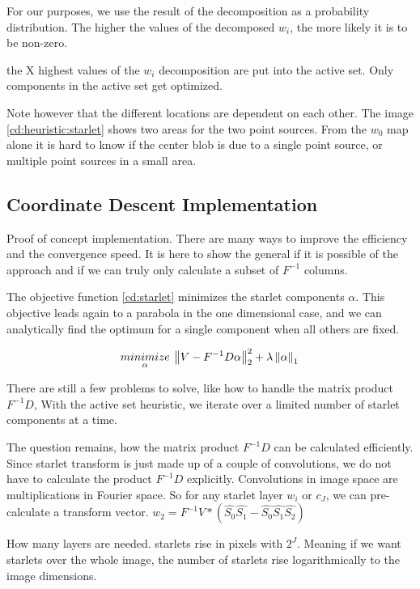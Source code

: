 For our purposes, we use the result of the decomposition as a probability distribution. The higher the values of the decomposed $w_i$, the more likely it is to be non-zero.

the X highest values of the $w_i$ decomposition are put into the active set. Only components in the active set get optimized.

Note however that the different locations are dependent on each other. The image \ref{cd:heuristic:starlet} shows two areas for the two point sources. From the $w_0$ map alone it is hard to know if the center blob is due to a single point source, or multiple point sources in a small area.


\subsection{Coordinate Descent Implementation}
Proof of concept implementation. There are many ways to improve the efficiency and the convergence speed. It is here to show  the general if it is possible of the approach and if we can truly only calculate a subset of $F^{-1}$ columns.

The objective function \eqref{cd:starlet} minimizes the starlet components $\alpha$. This objective leads again to a parabola in the one dimensional case, and we can analytically find the optimum for a single component when all others are fixed. 

\begin{equation}\label{cd:starlet}
\underset{\alpha}{minimize} \: \left \| V - F^{-1}D\alpha \right \|_2^2 + \lambda \left \| \alpha \right \|_1 \\
\end{equation}

There are still a few problems to solve, like how to handle the matrix product $F^{-1}D$, 
With the active set heuristic, we iterate over a limited number of starlet components at a time. 

The question remains, how the matrix product $F^{-1}D$ can be calculated efficiently. Since starlet transform is just made up of a couple of convolutions, we do not have to calculate the product $F^{-1}D$ explicitly. Convolutions in image space are multiplications in Fourier space. 
So for any starlet layer $w_i$ or $c_J$, we can pre-calculate a transform vector. 
$w_2 = F^{-1}V * (\hat{S_0}\hat{S_1} - \hat{S_0}\hat{S_1}\hat{S_2})$

How many layers are needed. starlets rise in pixels with $2^J$. Meaning if we want starlets over the whole image, the number of starlets rise logarithmically to the image dimensions.

